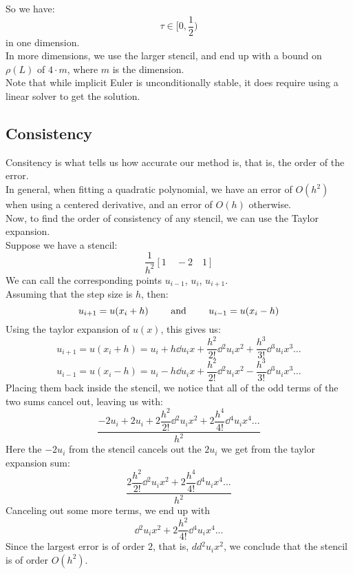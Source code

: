 \documentclass[12pt]{article}
\begin{document}
So we have:
\[ \tau \in \Big[0, \dfrac{1}{2}\Big) \]
in one dimension. \\

In more dimensions, we use the larger stencil, and
end up with a bound on $\rho(L)$ of $4 \cdot m$,
where $m$ is the dimension. \\

Note that while implicit Euler is unconditionally
stable, it does require using a linear solver to get
the solution. \\

\newpage

\subsection*{Consistency}

Consitency is what tells us how accurate our method is,
that is, the order of the error. \\

In general, when fitting a quadratic polynomial, 
we have an error of $O(h^2)$ when using a centered
derivative, and an error of $O(h)$ otherwise. \\

Now, to find the order of consistency of any stencil,
we can use the Taylor expansion. \\

Suppose we have a stencil:
\[ \dfrac{1}{h^2}[1 \quad -2 \quad 1] \]
We can call the corresponding points 
$u_{i-1}$, $u_i$, $u_{i+1}$. \\
Assuming that the step size is $h$, then:
\[ u_{i+1} = u(x_i + h) \qquad \text{ and } \qquad 
u_{i-1} = u(x_i - h) \]
Using the taylor expansion of $u(x)$, this gives us:
\[ u_{i+1} = u(x_i + h) = u_i + h \dd{u_i}{x}
+ \dfrac{h^2}{2!} \dd{^2u_i}{x^2} 
+ \dfrac{h^3}{3!} \dd{^3u_i}{x^3} \dots \]
\[ u_{i-1} = u(x_i - h) = u_i - h \dd{u_i}{x}
+ \dfrac{h^2}{2!} \dd{^2u_i}{x^2} 
- \dfrac{h^3}{3!} \dd{^3u_i}{x^3} \dots \]
Placing them back inside the stencil, we notice 
that all of the odd terms of the two sums cancel out,
leaving us with:
\[ \dfrac{-2u_i + 2u_i + 2\dfrac{h^2}{2!}\dd{^2u_i}{x^2}
+ 2\dfrac{h^4}{4!}\dd{^4u_i}{x^4} ...}{h^2} \]
Here the $-2u_i$ from the stencil cancels out the
$2u_i$ we get from the taylor expansion sum:
\[ \dfrac{2\dfrac{h^2}{2!}\dd{^2u_i}{x^2}
+ 2\dfrac{h^4}{4!}\dd{^4u_i}{x^4} ...}{h^2} \]
Canceling out some more terms, we end up with
\[ \dd{^2u_i}{x^2} + 2\dfrac{h^2}{4!}\dd{^4u_i}{x^4} ... \]
Since the largest error is of order $2$,
that is, $dd{^2u_i}{x^2}$, we conclude that the
stencil is of order $O(h^2)$. \\
\end{document}
